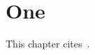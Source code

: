 \chapter{One}
This chapter cites~\cite{steiner_nwesp_2011,vanhooland_ukmw_2011}.

\printbibliography[heading=subbibliography]

